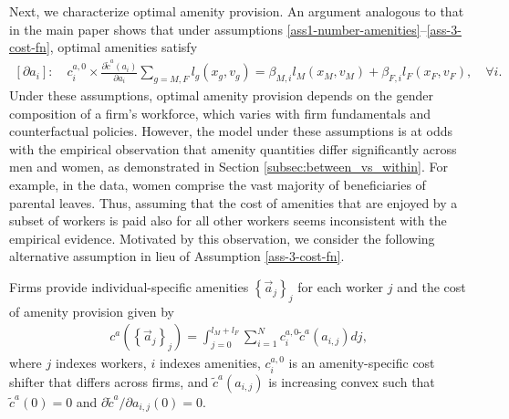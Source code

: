 Next, we characterize optimal amenity provision. An argument analogous to that in the main paper shows that under assumptions \ref{ass1-number-amenities}--\ref{ass-3-cost-fn}, optimal amenities satisfy
%
\begin{align}
    \left[\partial a_{i}\right]:\quad c_{i}^{a,0}\times\frac{\partial\tilde{c}^{a}\left(a_{i}\right)}{\partial a_{i}}\sum_{g=M,F}l_{g}\left(x_{g},v_{g}\right)=\beta_{M,i}l_{M}\left(x_{M},v_{M}\right)+\beta_{F,i}l_{F}\left(x_{F},v_{F}\right),\quad\forall i. \label{eq:optimal_pi_old}
\end{align}
%
Under these assumptions, optimal amenity provision depends on the gender composition of a firm's workforce, which varies with firm fundamentals and counterfactual policies. However, the model under these assumptions is at odds with the empirical observation that amenity quantities differ significantly across men and women, as demonstrated in Section \ref{subsec:between_vs_within}. %
%
For example, in the data, women comprise the vast majority of beneficiaries of parental leaves. Thus, assuming that the cost of amenities that are enjoyed by a subset of workers is paid also for all other workers seems inconsistent with the empirical evidence. Motivated by this observation, we consider the following alternative assumption in lieu of Assumption \ref{ass-3-cost-fn}.
%
\begin{assumption}\label{ass-3-cost-fn-alternative}
    Firms provide individual-specific amenities $\left\{ \vec{a}_{j}\right\} _{j}$ for each worker $j$ and the cost of amenity provision given by
    \begin{align}
        c^{a}\left(\left\{ \vec{a}_{j}\right\} _{j}\right)=\int_{j=0}^{l_{M}+l_{F}}\sum_{i=1}^{N}c_{i}^{a,0}\tilde{c}^{a}\left(a_{i,j}\right)dj,
    \end{align}
    where $j$ indexes workers, $i$ indexes amenities, $c_{i}^{a,0}$ is an amenity-specific cost shifter that differs across firms, and
    $\tilde{c}^{a}\left(a_{i,j}\right)$ is increasing convex such that $\tilde{c}^{a}(0)=0$ and $\partial\tilde{c}^{a}/\partial a_{i,j}(0)=0$.
\end{assumption}
%

